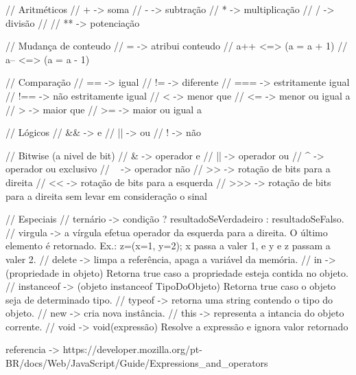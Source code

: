 // Aritméticos
    //   + -> soma
    //   - -> subtração
    //   * -> multiplicação
    //   / -> divisão
    //   %
    //   ** -> potenciação


// Mudança de conteudo
    // = -> atribui conteudo
    // a++ <=> (a = a + 1)
    // a-- <=> (a = a - 1)


// Comparação
    // ==  -> igual
    // !=  -> diferente
    // === -> estritamente igual
    // !== -> não estritamente igual
    // <   -> menor que
    // <=  -> menor ou igual a 
    // >   -> maior que
    // >=  -> maior ou igual a


// Lógicos
    // && -> e 
    // || -> ou 
    // !  -> não


// Bitwise (a nivel de bit)
    // &   -> operador e 
    // ||  -> operador ou
    // ^   -> operador ou exclusivo
    // ~   -> operador não
    // >>  -> rotação de bits para a direita
    // <<  -> rotação de bits para a esquerda
    // >>> -> rotação de bits para a direita sem levar em consideração o sinal


// Especiais
    // ternário    ->  condição ? resultadoSeVerdadeiro : resultadoSeFalso.
    // virgula     ->  a vírgula efetua operador da esquerda para a direita. O último elemento é retornado. Ex.: z=(x=1, y=2); x passa a valer 1, e y e z passam a valer 2.
    // delete      ->  limpa a referência, apaga a variável da memória.
    // in          ->  (propriedade in objeto) Retorna true caso a propriedade esteja contida no objeto.
    // instanceof  ->  (objeto instanceof TipoDoObjeto) Retorna true caso o objeto seja de determinado tipo.
    // typeof      ->  retorna uma string contendo o tipo do objeto.
    // new         ->  cria nova instância.
    // this        ->  representa a intancia do objeto corrente.
    // void        ->  void(expressão) Resolve a expressão e ignora valor retornado

referencia -> https://developer.mozilla.org/pt-BR/docs/Web/JavaScript/Guide/Expressions_and_operators